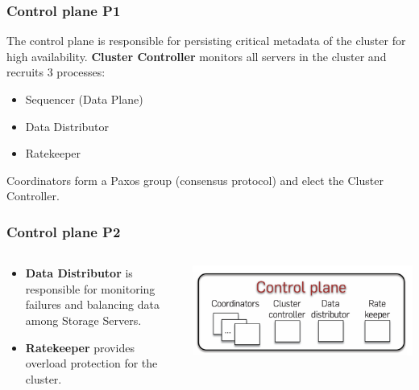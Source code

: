 
\begin{frame}
	\frametitle{Control plane P1}

The control plane is responsible for persisting critical metadata of the cluster for high availability.
\textbf{Cluster Controller} monitors all servers in the cluster and recruits 3 processes:
\begin{itemize}
    \item Sequencer (Data Plane)
    \item Data Distributor
    \item Ratekeeper
\end{itemize}

Coordinators form a Paxos group (consensus protocol) and elect the Cluster Controller.
\end{frame}



\begin{frame}
    \frametitle{Control plane P2}
    \begin{columns}
        \begin{column}{0.5\textwidth}
        \begin{itemize}
        \item \textbf{Data Distributor} is responsible for monitoring failures and balancing data among Storage Servers.
        \item \textbf{Ratekeeper} provides overload protection for the cluster.
        \end{itemize}
        
        \end{column}
        \begin{column}{0.5\textwidth}
            \centering
            \includegraphics[width=\textwidth]{img/2-Architecture/Control plane.png}
        \end{column}
    \end{columns}
\end{frame}



